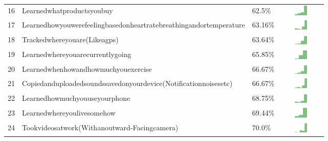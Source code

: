 \documentclass[a4paper,12pt]{article}
\begin{document}
\begin{longtable}{| p{0.5cm} | p{7cm} | p{1cm} | c |}
16 & Learnedwhatproductsyoubuy & 62.5\% & \includegraphics[width = 2cm, height = 0.5cm]{learnedwhatproductsyoubuyWORKCONTACTS} \\  
17 & Learnedhowyouwerefeelingbasedonheartratebreathingandortemperature & 63.16\% & \includegraphics[width = 2cm, height = 0.5cm]{learnedhowyouwerefeelingbasedonheartratebreathingandortemperatureWORKCONTACTS} \\  
18 & Trackedwhereyouare(Likeagps) & 63.64\% & \includegraphics[width = 2cm, height = 0.5cm]{trackedwhereyouare(likeaGPS)WORKCONTACTS} \\  
19 & Learnedwhereyouarecurrentlygoing & 65.85\% & \includegraphics[width = 2cm, height = 0.5cm]{learnedwhereyouarecurrentlygoingWORKCONTACTS} \\  
20 & Learnedwhenhowandhowmuchyouexercise & 66.67\% & \includegraphics[width = 2cm, height = 0.5cm]{learnedwhenhowandhowmuchyouexerciseWORKCONTACTS} \\  
21 & Copiedanduploadedsoundssavedonyourdevice(Notificationnoisesetc) & 66.67\% & \includegraphics[width = 2cm, height = 0.5cm]{copiedanduploadedsoundssavedonyourdevice(notificationnoisesetc)WORKCONTACTS} \\  
22 & Learnedhowmuchyouuseyourphone & 68.75\% & \includegraphics[width = 2cm, height = 0.5cm]{learnedhowmuchyouuseyourphoneWORKCONTACTS} \\  
23 & Learnedwhereyoulivesomehow & 69.44\% & \includegraphics[width = 2cm, height = 0.5cm]{learnedwhereyoulivesomehowWORKCONTACTS} \\  
24 & Tookvideosatwork(Withanoutward-Facingcamera) & 70.0\% & \includegraphics[width = 2cm, height = 0.5cm]{tookvideosatwork(withanoutward-facingcamera)WORKCONTACTS} \\  

\end{longtable}
\end{document}
